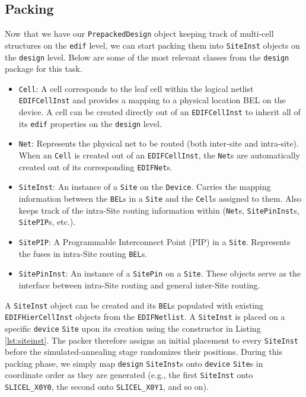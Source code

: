 \begin{multicols}{2}
\subsection{Packing}
\label{subsec:packing}
Now that we have our \texttt{PrepackedDesign} object keeping track of multi-cell structures on the \texttt{edif} level, we can start packing them into \texttt{SiteInst} objects on the \texttt{design} level. 
Below are some of the most relevant classes from the \texttt{design} package for this task.
\begin{itemize}
    \item \texttt{Cell}: A cell corresponds to the leaf cell within the logical netlist \texttt{EDIFCellInst} and provides a mapping to a physical location BEL on the device. A cell can be created directly out of an \texttt{EDIFCellInst} to inherit all of its \texttt{edif} properties on the \texttt{design} level.
    \item \texttt{Net}: Represents the physical net to be routed (both inter-site and intra-site). When an \texttt{Cell} is created out of an \texttt{EDIFCellInst}, the \texttt{Net}s are automatically created out of its corresponding \texttt{EDIFNet}s.
    \item \texttt{SiteInst}: An instance of a \texttt{Site} on the \texttt{Device}. Carries the mapping information between the \texttt{BEL}s in a \texttt{Site} and the \texttt{Cell}s assigned to them. Also keeps track of the intra-Site routing information within (\texttt{Net}s, \texttt{SitePinInst}s, \texttt{SitePIP}s, etc.).
    \item \texttt{SitePIP}: A Programmable Interconnect Point (PIP) in a \texttt{Site}. Represents the fuses in intra-Site routing \texttt{BEL}s. 
    \item \texttt{SitePinInst}: An instance of a \texttt{SitePin} on a \texttt{Site}. These objects serve as the interface between intra-Site routing and general inter-Site routing. 
\end{itemize}

A \texttt{SiteInst} object can be created and its \texttt{BEL}s populated with existing \texttt{EDIFHierCellInst} objects from the \texttt{EDIFNetlist}. 
A \texttt{SiteInst} is placed on a specific \texttt{device} \texttt{Site} upon its creation using the constructor in Listing \ref{lst:siteinst}. 
The packer therefore assigns an initial placement to every \texttt{SiteInst} before the simulated‐annealing stage randomizes their positions. 
During this packing phase, we simply map \texttt{design} \texttt{SiteInst}s onto \texttt{device} \texttt{Site}s in coordinate order as they are generated (e.g., the first \texttt{SiteInst} onto \texttt{SLICEL\_X0Y0}, the second onto \texttt{SLICEL\_X0Y1}, and so on). 


\end{multicols}

